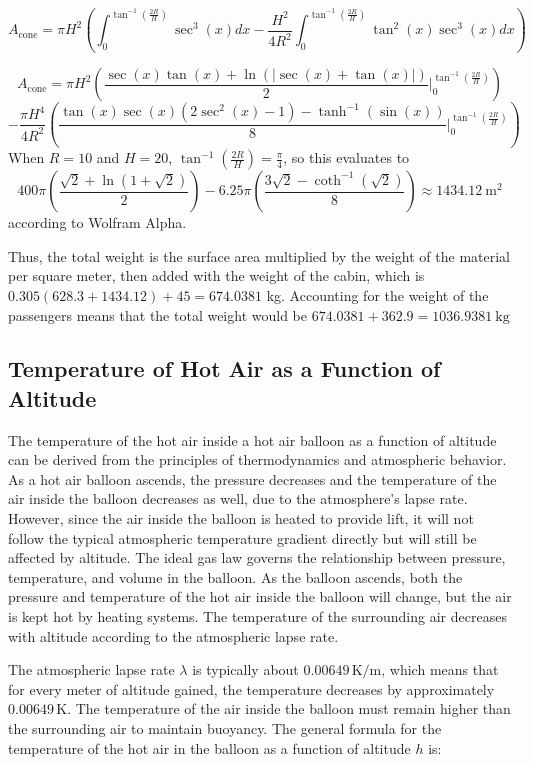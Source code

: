 \documentclass{article}
\begin{document}
\[
A_{\text{cone}} = \pi H^2 \left( \int_0^{\tan^{-1}(\frac{2R}{H})} \sec^3(x) dx - \frac{H^2}{4R^2}\int_0^{\tan^{-1}(\frac{2R}{H})} \tan^2(x)\sec^3(x) dx\right ) 
\]
 

\[
A_{\text{cone}} = \pi H^2 \left( \frac{\sec(x) \tan(x) + \ln(|\sec(x) + \tan(x)|)}{2} \Big|_0^{\tan^{-1}\left(\frac{2R}{H}\right)} \right)
\]
\[
- \frac{\pi H^4}{4R^2} \left( \frac{ \tan(x) \sec(x) \left( 2 \sec^2(x) - 1 \right) - \tanh^{-1}(\sin(x))}{8}\Big|_0^{\tan^{-1}\left(\frac{2R}{H}\right)}\right)
\]
When $R = 10$ and $H = 20$, $\tan^{-1}\left(\frac{2R}{H}\right) = \frac{\pi}{4}$, so this evaluates to 
\[400\pi\left(\frac{\sqrt2 + \ln(1 + \sqrt2)}{2}\right) - 6.25\pi \left( \frac{3\sqrt2 - \coth^{-1}(\sqrt2)}{8} \right) \approx 1434.12 \ \text{m} ^2 \] according to Wolfram Alpha.

Thus, the total weight is the surface area multiplied by the weight of the material per square meter, then added with the weight of the cabin, which is $0.305(628.3
+ 1434.12) + 45 = 674.0381$ kg. Accounting for the weight of the passengers means that the total weight would be $674.0381 + 362.9 = 1036.9381 \ \text{kg}$ 


\subsection*{Temperature of Hot Air as a Function of Altitude}
The temperature of the hot air inside a hot air balloon as a function of altitude can be derived from the principles of thermodynamics and atmospheric behavior. As a hot air balloon ascends, the pressure decreases and the temperature of the air inside the balloon decreases as well, due to the atmosphere's lapse rate. However, since the air inside the balloon is heated to provide lift, it will not follow the typical atmospheric temperature gradient directly but will still be affected by altitude.
The ideal gas law governs the relationship between pressure, temperature, and volume in the balloon. As the balloon ascends, both the pressure and temperature of the hot air inside the balloon will change, but the air is kept hot by heating systems. The temperature of the surrounding air decreases with altitude according to the atmospheric lapse rate.

The atmospheric lapse rate \( \lambda \) is typically about \( 0.00649 \, \text{K/m} \), which means that for every meter of altitude gained, the temperature decreases by approximately \( 0.00649 \, \text{K} \). The temperature of the air inside the balloon must remain higher than the surrounding air to maintain buoyancy. The general formula for the temperature of the hot air in the balloon as a function of altitude \( h \) is:
\end{document}
